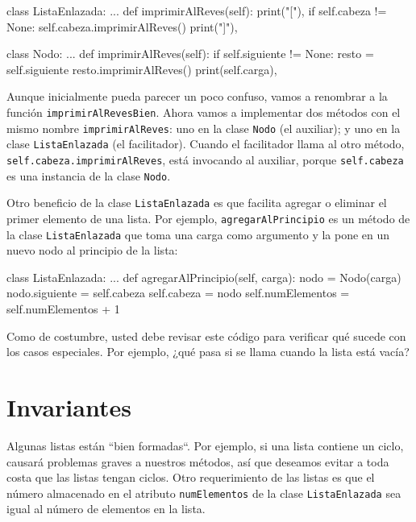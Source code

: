 \beforeverb 
\begin{pythoncode}
class ListaEnlazada:
  ...
  def imprimirAlReves(self):
    print("["),
    if self.cabeza != None:
      self.cabeza.imprimirAlReves()
    print("]"),

class Nodo:
  ...
  def imprimirAlReves(self):
    if self.siguiente != None:
      resto = self.siguiente
      resto.imprimirAlReves()
    print(self.carga),
\end{pythoncode}
\afterverb Aunque inicialmente pueda parecer un poco confuso, vamos
a renombrar a la función \texttt{imprimirAlRevesBien}. Ahora vamos
a implementar dos métodos con el mismo nombre \texttt{imprimirAlReves}:
uno en la clase \texttt{Nodo} (el auxiliar); y uno en la clase \texttt{ListaEnlazada}
(el facilitador). Cuando el facilitador llama al otro método, \texttt{self.cabeza.imprimirAlReves},
está invocando al auxiliar, porque \texttt{self.cabeza} es una instancia
de la clase \texttt{Nodo}.

Otro beneficio de la clase \texttt{ListaEnlazada} es que facilita
agregar o eliminar el primer elemento de una lista. Por ejemplo, \texttt{agregarAlPrincipio}
es un método de la clase \texttt{ListaEnlazada} que toma una carga
como argumento y la pone en un nuevo nodo al principio de la lista:

\beforeverb 
\begin{pythoncode}
class ListaEnlazada:
  ...
  def agregarAlPrincipio(self, carga):
    nodo = Nodo(carga)
    nodo.siguiente = self.cabeza
    self.cabeza = nodo
    self.numElementos = self.numElementos + 1
\end{pythoncode}
\afterverb Como de costumbre, usted debe revisar este código para
verificar qué sucede con los casos especiales. Por ejemplo, ¿qué pasa
si se llama cuando la lista está vacía?

\section{Invariantes}

  

Algunas listas están ``bien formadas``. Por ejemplo,
si una lista contiene un ciclo, causará problemas graves a nuestros
métodos, así que deseamos evitar a toda costa que las listas tengan
ciclos. Otro requerimiento de las listas es que el número almacenado
en el atributo \texttt{numElementos} de la clase \texttt{ListaEnlazada}
sea igual al número de elementos en la lista.

